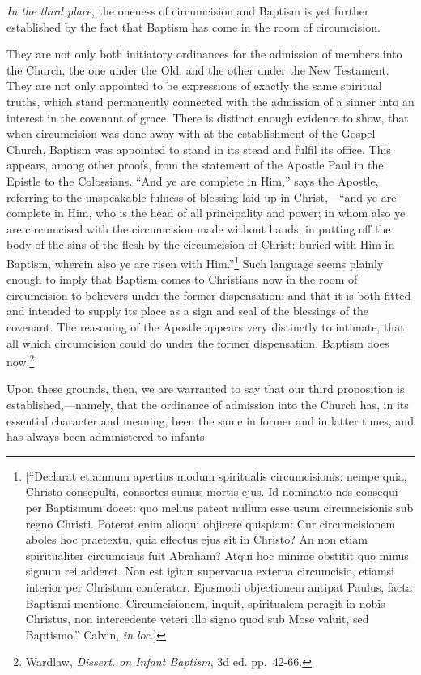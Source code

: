 \documentclass[english,]{book}
\begin{document}
\emph{In the third place}, the oneness of circumcision and Baptism is yet further established by the fact that Baptism has come in the room of circumcision.

They are not only both initiatory ordinances for the admission of members into the Church, the one under the Old, and the other under the New Testament. They are not only appointed to be expressions of exactly the same spiritual truths, which stand permanently connected with the admission of a sinner into an interest in the covenant of grace. There is distinct enough evidence to show, that when circumcision was done away with at the establishment of the Gospel Church, Baptism was appointed to stand in its stead and fulfil its office. This appears, among other proofs, from the statement of the Apostle Paul in the Epistle to the Colossians. ``And ye are complete in Him,'' says the Apostle, referring to the unspeakable fulness of blessing laid up in Christ,---``and ye are complete in Him, who is the head of all principality and power; in whom also ye are circumcised with the circumcision made without hands, in putting off the body of the sins of the flesh by the circumcision of Christ: buried with Him in Baptism, wherein also ye are risen with Him.''\footnote{{[}``Declarat etiamnum apertius modum spiritualis circumcisionis: nempe quia, Christo consepulti, consortes sumus mortis ejus. Id nominatio nos consequi per Baptismum docet: quo melius pateat nullum esse usum circumcisionis sub regno Christi. Poterat enim alioqui objicere quispiam: Cur circumcisionem aboles hoc praetextu, quia effectus ejus sit in Christo? An non etiam spiritualiter circumcisus fuit Abraham? Atqui hoc minime obstitit quo minus signum rei adderet. Non est igitur supervacua externa circumcisio, etiamsi interior per Christum conferatur. Ejusmodi objectionem antipat Paulus, facta Baptismi mentione. Circumcisionem, inquit, spiritualem peragit in nobis Christus, non intercedente veteri illo signo quod sub Mose valuit, sed Baptismo.'' Calvin, \emph{in loc}.{]}} Such language seems plainly enough to imply that Baptism comes to Christians now in the room of circumcision to believers under the former dispensation; and that it is both fitted and intended to supply its place as a sign and seal of the blessings of the covenant. The reasoning of the Apostle appears very distinctly to intimate, that all which circumcision could do under the former dispensation, Baptism does now.\footnote{Wardlaw, \emph{Dissert. on Infant Baptism}, 3d ed. pp.~42-66.}

Upon these grounds, then, we are warranted to say that our third proposition is established,---namely, that the ordinance of admission into the Church has, in its essential character and meaning, been the same in former and in latter times, and has always been administered to infants.
\end{document}
